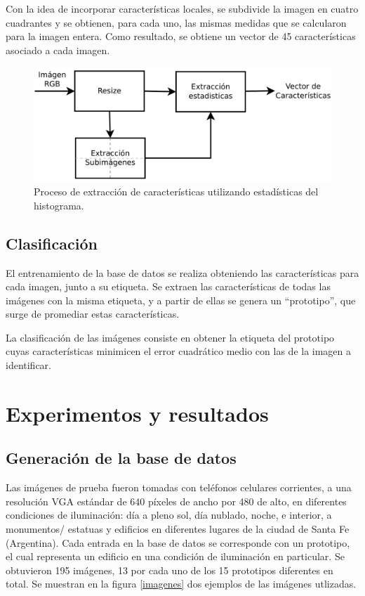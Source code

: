 \documentclass[conference,a4paper,10pt,oneside,final]{tfmpd}
\begin{document}
Con la idea de incorporar características locales,
se subdivide la imagen en cuatro
cuadrantes y se obtienen, para cada uno, las mismas medidas que se calcularon
para  la imagen entera. Como resultado, se obtiene un vector de 45
características asociado a cada imagen.

\begin{figure}
\begin{center}
\includegraphics[scale=0.25]{../diagramas/procesoestadisticas}
\end{center}
\caption{Proceso de extracción de características utilizando estadísticas del
histograma.}
\label{procesoestadisticas}
\end{figure}

\subsection{Clasificación}
El entrenamiento de la base de datos se realiza obteniendo las características
para cada imagen, junto a su etiqueta.
Se extraen las características de todas las imágenes
con la misma etiqueta, y a partir de ellas se genera un
``prototipo'', que surge de promediar estas características.

La clasificación de las imágenes consiste en
obtener la etiqueta del prototipo cuyas características
minimicen el error cuadrático medio con las de
la imagen a identificar.
%
%
%
%
\section{Experimentos y resultados}
%
%
\subsection{{Generación de la} base de datos}
Las imágenes de prueba fueron tomadas con teléfonos celulares corrientes, a una
resolución VGA estándar de 640 píxeles de ancho por 480 de alto, en
diferentes condiciones
de iluminación: día a pleno sol, día nublado, noche, e interior, a monumentos/%
estatuas y edificios en diferentes lugares de la ciudad de Santa Fe (Argentina).
{Cada entrada en la base de datos se corresponde con un prototipo, el cual
representa un edificio en una condición de iluminación en particular.}
{Se obtuvieron 195 imágenes, 13 por cada uno de los 15 prototipos diferentes en
total.}
Se muestran en la figura \ref{imagenes} dos ejemplos de las imágenes utlizadas.
%
%
\end{document}
